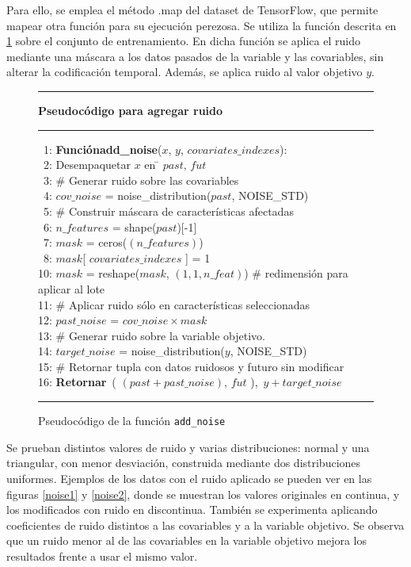 Para ello, se emplea el método .map del dataset de TensorFlow, que permite mapear otra función para su ejecución perezosa.
Se utiliza la función descrita en \ref{add_noise} sobre el conjunto de entrenamiento. En dicha función se aplica el ruido mediante una máscara
a los datos pasados de la variable y las covariables, sin alterar la codificación temporal. Además, se aplica ruido al valor objetivo $y$.

\begin{figure}[H]
{\small
\hrule
{\bf\small Pseudocódigo para agregar ruido}
\hrule
\begin{center}
\begin{tabbing}
\ 1: {\bf Función}\={\bf add\_noise}($x$, $y$, $covariates\_indexes$): \\
\ 2: \> Desempaquetar $x$ en \= $past,\, fut$ \\
\ 3: \> \# Generar ruido sobre las covariables \\
\ 4: \> $cov\_noise$ = noise\_distribution($past$, NOISE\_STD) \\
\ 5: \> \# Construir máscara de características afectadas \\
\ 6: \> $n\_features$ = shape($past$)[-1] \\
\ 7: \> $mask$ = ceros($(n\_features)$) \\
\ 8: \> $mask$[ $covariates\_indexes$ ] = 1 \\
10: \> $mask$ = reshape($mask$, $(1,1,n\_feat)$)  \# redimensión para aplicar al lote \\
11: \> \# Aplicar ruido sólo en características seleccionadas \\
12: \> $past\_noise$ = $cov\_noise \times mask$ \\
13: \> \# Generar ruido sobre la variable objetivo. \\
14: \> $target\_noise$ = noise\_distribution($y$, NOISE\_STD) \\
15: \> \# Retornar tupla con datos ruidosos y futuro sin modificar \\
16: \> {\bf Retornar}\ ( $(past + past\_noise),\, fut$ ),\ $y + target\_noise$ \\
\end{tabbing}
\end{center}
}
\hrule
\caption{Pseudocódigo de la función \texttt{add\_noise}}
\label{add_noise}
\end{figure}


Se prueban distintos valores de ruido y varias distribuciones: normal y una triangular, con menor desviación, construida mediante dos distribuciones uniformes.
Ejemplos de los datos con el ruido aplicado se pueden ver en las figuras \ref{noise1} y \ref{noise2}, donde se muestran los valores originales en continua, y los 
modificados con ruido en discontinua. También se experimenta aplicando coeficientes de ruido distintos a las covariables 
y a la variable objetivo. Se observa que un ruido menor al de las covariables en la variable objetivo mejora los resultados frente a usar el mismo valor.

